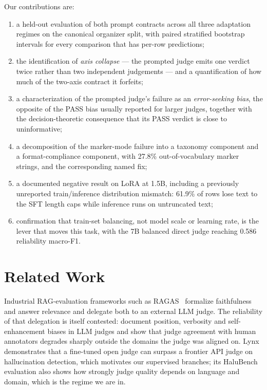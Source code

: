 \documentclass{zapiski}
\begin{document}
Our contributions are:
\begin{enumerate}
 \item a held-out evaluation of both prompt contracts across all three
 adaptation regimes on the canonical organizer split, with paired stratified
 bootstrap intervals for every comparison that has per-row predictions;
 \item the identification of \emph{axis collapse} --- the prompted judge
 emits one verdict twice rather than two independent judgements --- and a
 quantification of how much of the two-axis contract it forfeits;
 \item a characterization of the prompted judge's failure as an
 \emph{error-seeking bias}, the opposite of the PASS bias usually reported for
 larger judges, together with the decision-theoretic consequence that its PASS
 verdict is close to uninformative;
 \item a decomposition of the marker-mode failure into a taxonomy component
 and a format-compliance component, with 27.8\% out-of-vocabulary marker
 strings, and the corresponding named fix;
 \item a documented negative result on LoRA at 1.5B, including a
 previously unreported train/inference distribution mismatch: 61.9\% of rows
 lose text to the SFT length caps while inference runs on untruncated text;
 \item confirmation that train-set balancing, not model scale or learning
 rate, is the lever that moves this task, with the 7B balanced direct judge
 reaching 0.586 reliability macro-F1.
\end{enumerate}

\section{Related Work}
\label{sec:related}

Industrial RAG-evaluation frameworks such as RAGAS~\cite{es2023ragas}
formalize faithfulness and answer relevance and delegate both to an external
LLM judge. The reliability of that delegation is itself contested:
\cite{zheng2023judging} document position, verbosity and self-enhancement
biases in LLM judges and show that judge agreement with human annotators
degrades sharply outside the domains the judge was aligned on.
Lynx~\cite{ravi2024lynx} demonstrates that a fine-tuned open judge can surpass
a frontier API judge on hallucination detection, which motivates our
supervised branches; its HaluBench evaluation also shows how strongly judge
quality depends on language and domain, which is the regime we are in.
\end{document}
